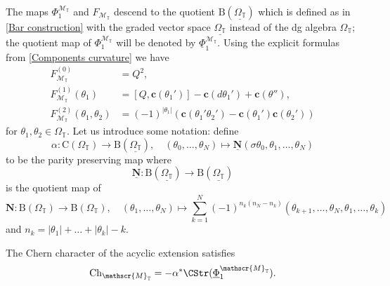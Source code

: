 \documentclass[a4paper, english, 12pt, bibliography=totocnumbered,
index=totoc]{scrartcl}
\begin{document}
The maps $\Phi_1^{\mathscr{M}_{\mathbb{T}}}$ and
$F_{\mathscr{M}_{\mathbb{T}}}$ descend to the quotient
$\mathrm{B}(\underline{\Omega_{\mathbb{T}}})$ which is defined as in \cref{Bar
construction} with the graded vector space $\underline{\Omega_{\mathbb{T}}}$
instead of the dg algebra $\Omega_{\mathbb{T}}$; the quotient map of
$\Phi_1^{\mathscr{M}_{\mathbb{T}}}$ will be denoted by
$\underline{\Phi}_1^{\mathscr{M}_{\mathbb{T}}}$.
Using the explicit formulas from \cref{Components curvature} we
have
\begin{align*}
	F_{\mathscr{M}_{\mathbb{T}}}^{(0)} & = Q^2, \\
	F_{\mathscr{M}_{\mathbb{T}}}^{(1)}(\theta_1) & =
	[Q, \mathbf{c}(\theta_1')] - \mathbf{c}(d
	\theta_1') + \mathbf{c}(\theta''), \\
	F_{\mathscr{M}_{\mathbb{T}}}^{(2)}(\theta_1, \theta_2) & =
	(-1)^{\lvert
		\theta_1 \rvert}(\mathbf{c}(\theta_1' \theta_2') -
	\mathbf{c}(\theta_1')\mathbf{c}(\theta_2'))
\end{align*}
for $\theta_1, \theta_2 \in \Omega_{\mathbb{T}}$.
Let us introduce some notation:
define
\begin{equation*}
	\alpha \colon \mathrm{C}(\Omega_{\mathbb{T}}) \to
	\mathrm{B}(\underline{\Omega_{\mathbb{T}}}), \quad (\theta_0, \ldots,
	\theta_N) \mapsto \underline{\mathbf{N}}(\sigma \theta_0, \theta_1,
	\ldots,
	\theta_N)
\end{equation*}
to be the parity preserving map where
\begin{equation}\label{Definition alpha}
	\underline{\mathbf{N}} \colon \mathrm{B}(\underline{\Omega_{\mathbb{T}}})
	\to \mathrm{B}(\underline{\Omega_{\mathbb{T}}})
\end{equation}
is the quotient map of
\begin{equation*}
	\mathbf{N} \colon \mathrm{B}(\Omega_{\mathbb{T}}) \to
	\mathrm{B}(\Omega_{\mathbb{T}}), \quad (\theta_1, \ldots, \theta_N)
	\mapsto
	\sum_{k = 1}^N (-1)^{n_k(n_N - n_k)} (\theta_{k+1}, \ldots, \theta_N,
	\theta_1, \ldots, \theta_k)
\end{equation*}
and $n_k = \lvert \theta_1 \rvert + \ldots + \lvert \theta_k \rvert - k$.
\begin{lem}\label{Ch pullback}
	The Chern character of the acyclic extension satisfies
	\begin{equation*}
		\mathrm{Ch}_{\mathscr{M}_{\mathbb{T}}} = - \alpha^*
		\CStr(\underline{\Phi}_1^{\mathscr{M}_{\mathbb{T}}}).
	\end{equation*}
\end{lem}
\end{document}
